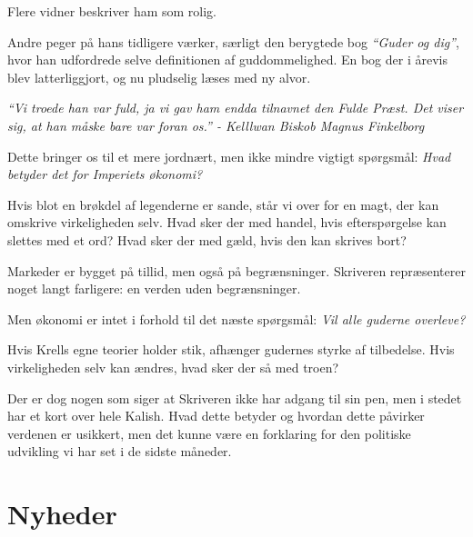\documentclass[letterpaper,12pt]{memoir}
\newenvironment{pullquote}
  {\begin{tcolorbox}[enhanced, breakable]\itshape\large}
  {\end{tcolorbox}}
\begin{document}
Flere vidner beskriver ham som rolig.

Andre peger på hans tidligere værker, særligt den berygtede bog \emph{“Guder og dig”}, hvor han udfordrede selve definitionen af guddommelighed. En bog der i årevis blev latterliggjort, og nu pludselig læses med ny alvor.

\begin{pullquote}
“Vi troede han var fuld, ja vi gav ham endda tilnavnet den Fulde Præst. Det viser sig, at han måske bare var foran os.”
- Kelllwan Biskob Magnus Finkelborg
\end{pullquote}

\par\medskip

Dette bringer os til et mere jordnært, men ikke mindre vigtigt spørgsmål: \emph{Hvad betyder det for Imperiets økonomi?}

Hvis blot en brøkdel af legenderne er sande, står vi over for en magt, der kan omskrive virkeligheden selv. Hvad sker der med handel, hvis efterspørgelse kan slettes med et ord? Hvad sker der med gæld, hvis den kan skrives bort?

Markeder er bygget på tillid, men også på begrænsninger. Skriveren repræsenterer noget langt farligere: en verden uden begrænsninger.

\par\medskip

Men økonomi er intet i forhold til det næste spørgsmål: \emph{Vil alle guderne overleve?}

Hvis Krells egne teorier holder stik, afhænger gudernes styrke af tilbedelse. Hvis virkeligheden selv kan ændres, hvad sker der så med troen?

\par\medskip

Der er dog nogen som siger at Skriveren ikke har adgang til sin pen, men i stedet har et kort over hele Kalish. Hvad dette betyder og hvordan dette påvirker verdenen er usikkert, men det kunne være en forklaring for den politiske udvikling vi har set i de sidste måneder. 

\section*{Nyheder}
\end{document}
